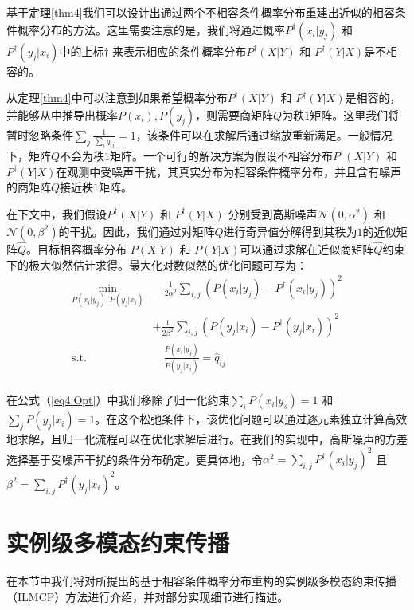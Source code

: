 基于定理\ref{thm4}我们可以设计出通过两个不相容条件概率分布重建出近似的相容条件概率分布的方法。这里需要注意的是，我们将通过概率$P^\dagger (x_i|y_j)$ 和 $P^\dagger (y_j|x_i)$中的上标$\dagger$ 来表示相应的条件概率分布$P^\dagger (X|Y)$ 和  $P^\dagger (Y|X)$是不相容的。

从定理\ref{thm4}中可以注意到如果希望概率分布$P^\dagger (X|Y)$ 和  $P^\dagger (Y|X)$是相容的，并能够从中推导出概率$P(x_i), P(y_j)$，则需要商矩阵$Q$为秩$1$矩阵。这里我们将暂时忽略条件$\sum_j\frac{1}{\sum_i {q}_{ij}} = 1$，该条件可以在求解后通过缩放重新满足。一般情况下，矩阵$Q$不会为秩$1$矩阵。一个可行的解决方案为假设不相容分布$P^\dagger (X|Y)$ 和  $P^\dagger (Y|X)$在观测中受噪声干扰，其真实分布为相容条件概率分布，并且含有噪声的商矩阵$Q$接近秩$1$矩阵。

在下文中，我们假设$P^\dagger(X|Y)$ 和 $P^\dagger(Y|X)$ 分别受到高斯噪声$ \mathcal{N}(0, \alpha^2) $ 和  $ \mathcal{N}(0, \beta^2) $的干扰。因此，我们通过对矩阵$Q$进行奇异值分解得到其秩为$1$的近似矩阵$\hat{{Q}}$。目标相容概率分布 $P(X|Y)$ 和  $P(Y|X)$可以通过求解在近似商矩阵$\hat{{Q}}$约束下的极大似然估计求得。最大化对数似然的优化问题可写为：
\begin{equation}
\begin{split}
\mathop{\mathrm{min}}_{P(x_i|y_j), P(y_j|x_i)} & \quad \frac{1}{2 \alpha^2} \sum_{i,j}(P(x_i|y_j)-P^\dagger(x_i|y_j))^2 \\
&+ \frac{1}{2 \beta^2} \sum_{i,j}(P(y_j|x_i)-P^\dagger(y_j|x_i))^2\\
\mathrm{s.t.}\quad \quad \quad&\quad \frac{P(x_i|y_j)}{P(y_j|x_i)} = \hat{{q}}_{ij}\\
\end{split}
\label{eq4:Opt}
\end{equation}

在公式（\ref{eq4:Opt}）中我们移除了归一化约束$\sum_{i}P(x_i|y_s) = 1$ 和  $\sum_{j}P(y_j|x_i) = 1$。在这个松弛条件下，该优化问题可以通过逐元素独立计算高效地求解，且归一化流程可以在优化求解后进行。在我们的实现中，高斯噪声的方差选择基于受噪声干扰的条件分布确定。更具体地，令$\alpha^2 = \sum_{i,j}P^\dagger(x_i|y_j)^2$ 且 $\beta^2 = \sum_{i,j}P^\dagger(y_j|x_i)^2$。

\section{实例级多模态约束传播}
在本节中我们将对所提出的基于相容条件概率分布重构的实例级多模态约束传播（ILMCP）方法进行介绍，并对部分实现细节进行描述。
